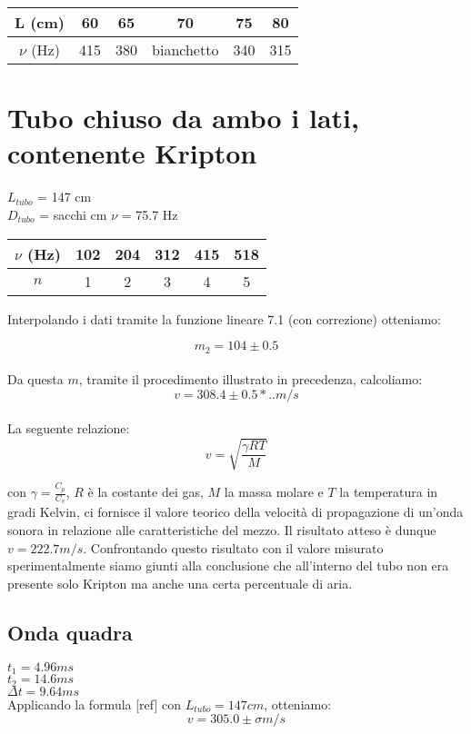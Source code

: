 \begin{center}
\begin{tabular}{*{5}{c|}c}
L (cm) & 60 & 65 & 70 & 75 & 80 \\
\midrule
$\nu$ (Hz) & 415 & 380 & bianchetto & 340 & 315\\
\end{tabular}
\end{center}


\section{Tubo chiuso da ambo i lati, contenente Kripton}

$L_{tubo}$ = 147 cm\\
$D_{tubo}$ = sacchi cm
$\nu$ = 75.7 Hz
 


\begin{center}
\begin{tabular}{c|c|c|c|c|c}
$\nu$ (Hz) & 102 & 204 & 312 & 415 & 518 \\
\midrule
$n$ & 1 & 2 & 3 & 4 & 5\\
\end{tabular}
\end{center}

Interpolando i dati tramite la funzione lineare 7.1 (con correzione) otteniamo:

$$ m_2 = 104 \pm 0.5 $$ 
\\
Da questa $m$, tramite il procedimento illustrato in precedenza, calcoliamo: 
$$v = 308.4\pm0.5*..  m/s $$
\\
La seguente relazione:
$$v=\sqrt{\frac{\gamma RT}{M}}$$

con $\gamma = \frac{C_p}{C_v}$, $R$ è la costante dei gas, $M$ la massa molare e $T$ la temperatura in gradi Kelvin, ci fornisce il valore teorico della velocità di propagazione di un'onda sonora in relazione alle caratteristiche del mezzo. 
Il risultato atteso è dunque $v=222.7 m/s$. Confrontando questo risultato con il valore misurato sperimentalmente siamo giunti alla conclusione che all'interno del tubo non era presente solo Kripton ma anche una certa percentuale di aria.

\subsection{Onda quadra}
$t_1 = 4.96 ms $\\
$t_2 = 14.6 ms $\\
$\Delta t = 9.64 ms $ \\
Applicando la formula [ref] con $L_{tubo} = 147 cm$, otteniamo:
$$ v = 305.0 \pm \sigma m/s $$ 


